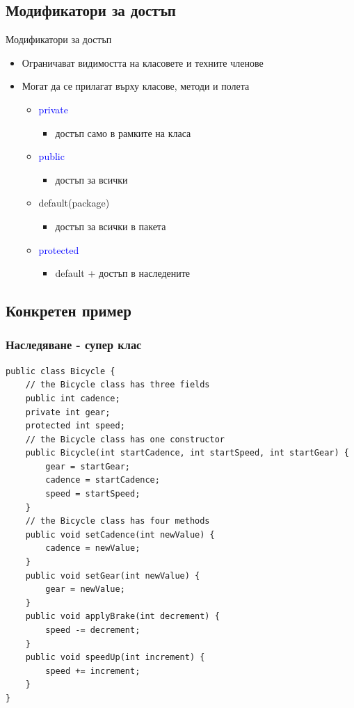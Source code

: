 \documentclass{beamer}
\begin{document}
\subsection{Модификатори за достъп}
\begin{frame}{Модификатори за достъп}
  \transdissolve
  \begin{itemize}
  \item Ограничават видимостта на класовете и техните членове \pause
  \item Могат да се прилагат върху класове, методи и полета \pause
    \begin{itemize}
    \item \textcolor{blue}{private}
      \begin{itemize}
      \item достъп само в рамките на класа
      \end{itemize} \pause
    \item \textcolor{blue}{public}
      \begin{itemize}
      \item достъп за всички
      \end{itemize} \pause
    \item default(package)
      \begin{itemize}
      \item достъп за всички в пакета
      \end{itemize} \pause
    \item \textcolor{blue}{protected}
      \begin{itemize}
      \item default + достъп в наследените
      \end{itemize} \pause
    \end{itemize}    
  \end{itemize}
\end{frame}

\subsection{Конкретен пример}
\begin{frame}[fragile]
  \frametitle{Наследяване - супер клас}
  \transdissolve
\begin{lstlisting}[basicstyle=\tiny]
public class Bicycle {
    // the Bicycle class has three fields
    public int cadence;
    private int gear;
    protected int speed;
    // the Bicycle class has one constructor
    public Bicycle(int startCadence, int startSpeed, int startGear) {
        gear = startGear;
        cadence = startCadence;
        speed = startSpeed;
    }
    // the Bicycle class has four methods
    public void setCadence(int newValue) {
        cadence = newValue;
    }
    public void setGear(int newValue) {
        gear = newValue;
    }
    public void applyBrake(int decrement) {
        speed -= decrement;
    }
    public void speedUp(int increment) {
        speed += increment;
    }
}
\end{lstlisting}
\end{frame}
\end{document}
